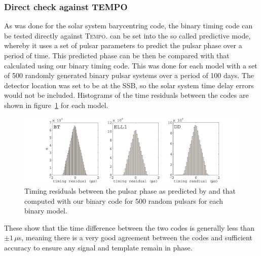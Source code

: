 \subsubsection{Direct check against TEMPO}
As was done for the solar system barycentring code, the binary timing code can be tested directly
against T\textsc{empo}. \tempo can be set into the so called predictive mode, whereby it uses a set
of pulsar parameters to predict the pulsar phase over a period of time. This predicted phase can be
then be compared with that calculated using our binary timing code. This was done for each model
with a set of 500 randomly generated binary pulsar systems over a period of 100 days. The
detector location was set to be at the SSB, so the solar system time delay errors would not be
included. Histograms of the time residuals between the codes are shown in
figure~\ref{TEMPOComparison} for each model.
\begin{figure}[!htbp]
\begin{center}
\includegraphics[width=1.0\textwidth]{figs/TEMPOComparison}
\caption[Timing residuals between our code and T\textsc{empo}.]{Timing residuals between the pulsar
phase as predicted by \tempo and that computed with our binary code for 500 random pulsars for each
binary model.}\label{TEMPOComparison}
\end{center}
\end{figure}
These show that the time difference between the two codes is generally less than $\pm1\,\mu$s,
meaning there is a very good agreement between the codes and sufficient accuracy to ensure any
signal and template remain in phase.